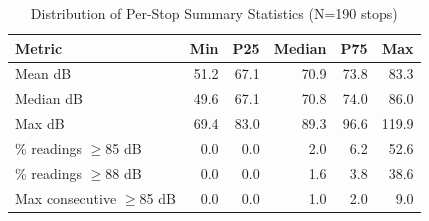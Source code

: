 \begin{table}[htbp]
\centering
\caption{Distribution of Per-Stop Summary Statistics (N=190 stops)}
\label{tab:stop_distribution}
\begin{tabular}{lrrrrr}
\toprule
Metric & Min & P25 & Median & P75 & Max \\
\midrule
Mean dB & 51.2 & 67.1 & 70.9 & 73.8 & 83.3 \\
Median dB & 49.6 & 67.1 & 70.8 & 74.0 & 86.0 \\
Max dB & 69.4 & 83.0 & 89.3 & 96.6 & 119.9 \\
\% readings $\geq$85 dB & 0.0 & 0.0 & 2.0 & 6.2 & 52.6 \\
\% readings $\geq$88 dB & 0.0 & 0.0 & 1.6 & 3.8 & 38.6 \\
Max consecutive $\geq$85 dB & 0.0 & 0.0 & 1.0 & 2.0 & 9.0 \\
\bottomrule
\end{tabular}
\end{table}
